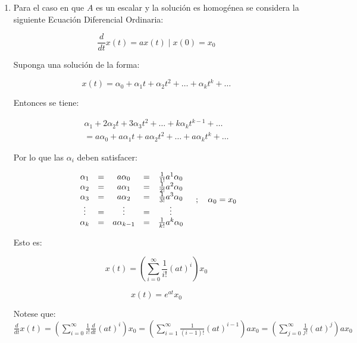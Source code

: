 \documentclass[12pt]{article}
\numberwithin{equation}{subsection}
\begin{document}
\begin{enumerate}

\item
Para el caso en que $A$ es un escalar y la solución es homogénea se considera la siguiente Ecuación Diferencial Ordinaria:

\begin{equation}
\frac{d}{dt} x(t) = a x(t) \mid x(0) = x_0
\end{equation}

Suponga una solución de la forma:

\begin{equation}
x(t) = \alpha_0 + \alpha_1 t + \alpha_2 t^2 + \dots + \alpha_k t^k + \dots
\end{equation}

Entonces se tiene:

\begin{multline}
\alpha_1 + 2 \alpha_2 t + 3 \alpha_3 t^2 + \dots + k \alpha_k t^{k-1} + \dots \\ = a \alpha_0 + a \alpha_1 t + a \alpha_2 t^2 + \dots + a \alpha_k t^k + \dots \nonumber
\end{multline}

Por lo que las $\alpha_i$ deben satisfacer:

\begin{equation}
\begin{array}{c c c c c}
\alpha_1 & = & a \alpha_0     & = & \frac{1}{1!} a^1 \alpha_0 \\
\alpha_2 & = & a \alpha_1     & = & \frac{1}{2!} a^2 \alpha_0 \\
\alpha_3 & = & a \alpha_2     & = & \frac{1}{3!} a^3 \alpha_0 \\
\vdots   & = & \vdots         & = & \vdots                    \\
\alpha_k & = & a \alpha_{k-1} & = & \frac{1}{k!} a^k \alpha_0 \\
\end{array} \quad ; \quad \alpha_0 = x_0
\end{equation}

Esto es:

\begin{equation}
x(t) = \left( \sum\limits_{i = 0}^{\infty} \frac{1}{i!} (a t)^i \right) x_0 \nonumber
\end{equation}

\begin{equation}
x(t) = e^{at} x_0
\end{equation}

Notese que: $\frac{d}{dt} x(t) = \left( \sum\limits_{i=0}^{\infty} \frac{1}{i!} \frac{d}{dt} (at)^i \right) x_0 = \left( \sum\limits_{i=1}^{\infty} \frac{1}{(i-1)!} (at)^{i-1} \right) a x_0 = \left( \sum\limits_{j=0}^{\infty} \frac{1}{j!} (at)^j \right) a x_0$


\end{enumerate}
\end{document}
